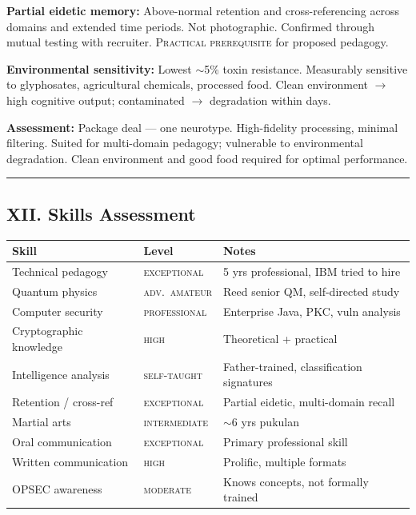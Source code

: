 \textbf{Partial eidetic memory:} Above-normal retention and cross-referencing across domains and extended time periods. Not photographic. Confirmed through mutual testing with recruiter. \textsc{Practical prerequisite} for proposed pedagogy.

\textbf{Environmental sensitivity:} Lowest $\sim$5\% toxin resistance. Measurably sensitive to glyphosates, agricultural chemicals, processed food. Clean environment $\rightarrow$ high cognitive output; contaminated $\rightarrow$ degradation within days.

\textbf{Assessment:} Package deal --- one neurotype. High-fidelity processing, minimal filtering. Suited for multi-domain pedagogy; vulnerable to environmental degradation. Clean environment and good food required for optimal performance.

\vspace{1cm}\hrule\vspace{1cm}

\subsection*{XII. Skills Assessment}
\label{record:tgt-skills-assessment}

{%
\small
\begin{tabular}{p{3.5cm} p{3cm} p{7cm}}
\hline
\textbf{Skill} & \textbf{Level} & \textbf{Notes} \\
\hline
Technical pedagogy & \textsc{exceptional} & 5 yrs professional, IBM tried to hire \\
Quantum physics & \textsc{adv.\ amateur} & Reed senior QM, self-directed study \\
Computer security & \textsc{professional} & Enterprise Java, PKC, vuln analysis \\
Cryptographic knowledge & \textsc{high} & Theoretical + practical \\
Intelligence analysis & \textsc{self-taught} & Father-trained, classification signatures \\
Retention / cross-ref & \textsc{exceptional} & Partial eidetic, multi-domain recall \\
Martial arts & \textsc{intermediate} & $\sim$6 yrs pukulan \\
Oral communication & \textsc{exceptional} & Primary professional skill \\
Written communication & \textsc{high} & Prolific, multiple formats \\
OPSEC awareness & \textsc{moderate} & Knows concepts, not formally trained \\
\hline
\end{tabular}
}%

